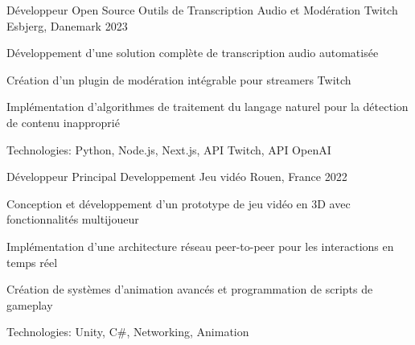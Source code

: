 


\begin{cventries}


\cventry
{Développeur Open Source} %
{Outils de Transcription Audio et Modération Twitch} %
{Esbjerg, Danemark} %
{2023} %
{ %
\begin{cvitems}
\item {Développement d'une solution complète de transcription audio automatisée}
\item {Création d'un plugin de modération intégrable pour streamers Twitch}
\item {Implémentation d'algorithmes de traitement du langage naturel pour la détection de contenu inapproprié}
\item {Technologies: Python, Node.js, Next.js, API Twitch, API OpenAI}
\end{cvitems}
}
\vspace{1.5em}


\cventry
{Développeur Principal} %
{Developpement Jeu vidéo} %
{Rouen, France} %
{2022} %
{ %
\begin{cvitems}
\item {Conception et développement d'un prototype de jeu vidéo en 3D avec fonctionnalités multijoueur}
\item {Implémentation d'une architecture réseau peer-to-peer pour les interactions en temps réel}
\item {Création de systèmes d'animation avancés et programmation de scripts de gameplay}
\item {Technologies: Unity, C\#, Networking, Animation}
\end{cvitems}
}
\vspace{1.5em}




\end{cventries}
